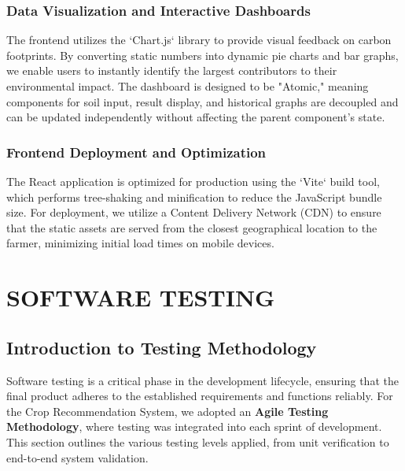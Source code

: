 \documentclass[12pt,a4paper]{report}
\begin{document}
\subsection{Data Visualization and Interactive Dashboards}
The frontend utilizes the `Chart.js` library to provide visual feedback on carbon footprints. By converting static numbers into dynamic pie charts and bar graphs, we enable users to instantly identify the largest contributors to their environmental impact. The dashboard is designed to be "Atomic," meaning components for soil input, result display, and historical graphs are decoupled and can be updated independently without affecting the parent component's state.

\subsection{Frontend Deployment and Optimization}
The React application is optimized for production using the `Vite` build tool, which performs tree-shaking and minification to reduce the JavaScript bundle size. For deployment, we utilize a Content Delivery Network (CDN) to ensure that the static assets are served from the closest geographical location to the farmer, minimizing initial load times on mobile devices.

\newpage

\chapter{SOFTWARE TESTING}
\label{ch:6}

\section{Introduction to Testing Methodology}
\label{sec:6.1}
Software testing is a critical phase in the development lifecycle, ensuring that the final product adheres to the established requirements and functions reliably. For the Crop Recommendation System, we adopted an \textbf{Agile Testing Methodology}, where testing was integrated into each sprint of development. This section outlines the various testing levels applied, from unit verification to end-to-end system validation.
\end{document}
